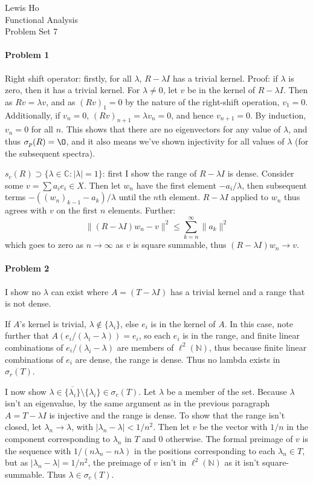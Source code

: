 \documentclass[12pt]{article}
\newcommand{\s}{\sigma}
\renewcommand{\l}{\lambda}
\begin{document}
\begin{center}
  Lewis Ho\\
  Functional Analysis\\
  Problem Set 7
\end{center}

\paragraph{Problem 1}
Right shift operator: firstly, for all $\l$, $R-\l I$ has a trivial kernel.
Proof: if $\l$ is zero, then it has a trivial kernel. For $\l \neq 0$, 
let $v$ be in the kernel of $R-\l I$. Then as $Rv = \l v$, and as $(Rv)_1 =
0$ by the nature of the right-shift operation, $v_1 = 0$. Additionally, if
$v_n = 0$, $(Rv)_{n+1} = \lambda v_n = 0$, and hence $v_{n+1} = 0$. By induction,
$v_n = 0$ for all $n$. This shows that there are no eigenvectors for any value
of $\l$, and thus $\s_p(R) = \O$, and it also means we've shown injectivity
for all values of $\l$ (for the subsequent spectra).

$s_c(R) \supset \{\l\in \mathbb{C}: |\l |=1\}$: first I show the range of $R-\l
I$ is dense. Consider some $v = \sum a_ie_i \in X$. Then let $w_n$ have the
first element $-a_i/\l$, then subsequent terms $-((w_n)_{k-1}-a_k)/\lambda$
until the $n$th element. $R-\l I$ applied to $w_n$ thus agrees with $v$ on the
first $n$ elements. Further:
\begin{displaymath}
  \|(R-\l I)w_n-v\|^2 \leq \sum_{k=n}^\infty\|a_k\|^2
\end{displaymath}
which goes to zero as $n\to \infty$ as $v$ is square summable, thus $(R-\l I)w_n
\to v$.


\paragraph{Problem 2}
I show no $\l$ can exist where $A = (T-\l I)$ has a trivial kernel and a
range that is not dense.

If $A$'s kernel is trivial, $\l \notin \{\l_i\}$, else $e_i$ is in the kernel of
$A$. In this case, note further that $A(e_i/(\l_i-\l)) = e_i$, so each $e_i$ is
in the range, and finite linear combinations of $e_i/(\l_i-\l)$ are members of
$\ell^2(\mathbb{N})$, thus because finite linear combinations of $e_i$ are dense,
the range is dense. Thus no lambda exists in $\sigma_r(T)$.

I now show $\lambda \in \overline{\{\l_i\}} \setminus \{\l_i\} \in \sigma_c(T)$.
Let $\l$ be a member of the set. Because $\l$ isn't an eigenvalue, by the same
argument as in the previous paragraph $A = T-\l I$ is injective and the range
is dense. To show that the range isn't closed, let $\l_n\to \l$, with $|\l_n-\l|
< 1/n^2$. Then let $v$ be the vector with $1/n$ in the component corresponding
to $\l_n$ in $T$ and 0 otherwise. The formal preimage of $v$ is the sequence with
$1/(n\l_n-n\l)$ in the positions corresponding to each $\l_n \in T$, but as
$|\l_n-\l| = 1/n^2$, the preimage of $v$ isn't in $\ell^2(\mathbb{N})$ as it
isn't square-summable. Thus $\l \in \sigma_c(T)$.
\end{document}
